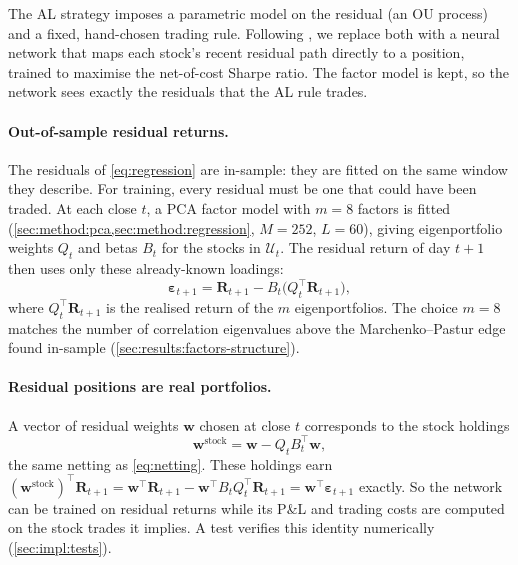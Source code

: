 The AL strategy imposes a parametric model on the residual (an OU process) and a fixed,
hand-chosen trading rule. Following \citet{guijarro2021}, we replace both with a neural network
that maps each stock's recent residual path directly to a position, trained to maximise the
net-of-cost Sharpe ratio. The factor model is kept, so the network sees exactly the residuals
that the AL rule trades.

\paragraph{Out-of-sample residual returns.}
The residuals of \cref{eq:regression} are in-sample: they are fitted on the same window they
describe. For training, every residual must be one that could have been traded. At each close
$t$, a PCA factor model with $m=8$ factors is fitted (\cref{sec:method:pca,sec:method:regression},
$M=252$, $L=60$), giving eigenportfolio weights $Q_t$ and betas $B_t$ for the stocks in
$\mathcal U_t$. The residual return of day $t+1$ then uses only these already-known loadings:
\begin{equation}
  \bm\varepsilon_{t+1} = \bm R_{t+1} - B_t\bigl(Q_t^\top \bm R_{t+1}\bigr),
  \label{eq:oos-residual}
\end{equation}
where $Q_t^\top \bm R_{t+1}$ is the realised return of the $m$ eigenportfolios. The choice $m=8$
matches the number of correlation eigenvalues above the Marchenko--Pastur edge found in-sample
(\cref{sec:results:factors-structure}).

\paragraph{Residual positions are real portfolios.}
A vector of residual weights $\bm w$ chosen at close $t$ corresponds to the stock holdings
\begin{equation}
  \bm w^{\text{stock}} = \bm w - Q_t B_t^\top \bm w ,
  \label{eq:deep-stock}
\end{equation}
the same netting as \cref{eq:netting}. These holdings earn
$(\bm w^{\text{stock}})^\top \bm R_{t+1} = \bm w^\top \bm R_{t+1} - \bm w^\top B_t Q_t^\top \bm R_{t+1}
= \bm w^\top \bm\varepsilon_{t+1}$ exactly. So the network can be trained on residual returns
while its P\&L and trading costs are computed on the stock trades it implies. A test verifies this
identity numerically (\cref{sec:impl:tests}).

